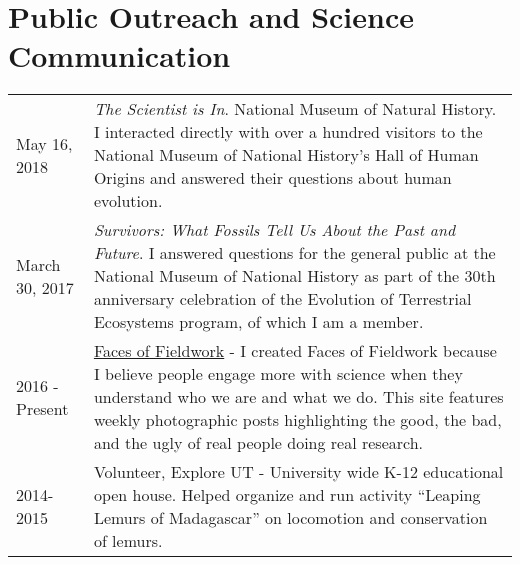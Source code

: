 \documentclass{article}
\begin{document}
\section*{Public Outreach and Science Communication}
\begin{longtable}{p{}p{}}
May 16, 2018 & \emph{The Scientist is In}. National Museum of Natural History. I interacted directly with over a hundred visitors to the National Museum of National History's Hall of Human Origins and answered their questions about human evolution.\\[4pt]
March 30, 2017 & \emph{Survivors: What Fossils Tell Us About the Past and Future}. I answered questions for the general public at the National Museum of National History as part of the 30th anniversary celebration of the Evolution of Terrestrial Ecosystems program, of which I am a member. \\[4pt]
2016 - Present & \href{http://facesoffieldwork.com}{Faces of Fieldwork} - I created Faces of Fieldwork because I believe people engage more with science when they understand who we are and what we do. This site features weekly photographic posts highlighting the good, the bad, and the ugly of real people doing real research.\\[4pt]
2014-2015 & Volunteer, Explore UT - University wide K-12 educational open house. Helped organize and run activity ``Leaping Lemurs of Madagascar'' on locomotion and conservation of lemurs.\\
\end{longtable}
\end{document}

